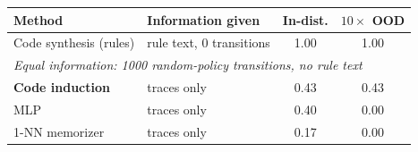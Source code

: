 \begin{tabular}{llcc}
\toprule
Method & Information given & In-dist. & $10\times$ OOD \\
\midrule
Code synthesis (rules) & rule text, 0 transitions & 1.00 & 1.00 \\
\midrule
\multicolumn{4}{l}{\emph{Equal information: 1000 random-policy transitions, no rule text}} \\
\textbf{Code induction} & traces only & 0.43 & 0.43 \\
MLP & traces only & 0.40 & 0.00 \\
1-NN memorizer & traces only & 0.17 & 0.00 \\
\bottomrule
\end{tabular}
